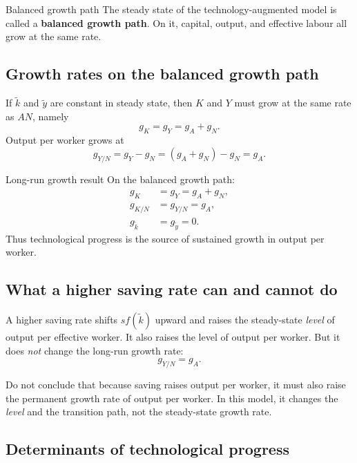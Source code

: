 \documentclass[12pt]{article}
\begin{document}
\begin{definition}{Balanced growth path}{}
The steady state of the technology-augmented model is called a \textbf{balanced growth path}. On it, capital, output, and effective labour all grow at the same rate.
\end{definition}

\subsection{Growth rates on the balanced growth path}

If $\tilde{k}$ and $\tilde{y}$ are constant in steady state, then $K$ and $Y$ must grow at the same rate as $AN$, namely
\[
g_K=g_Y=g_A+g_N.
\]
Output per worker grows at
\[
g_{Y/N}=g_Y-g_N=(g_A+g_N)-g_N=g_A.
\]

\begin{theorem}{Long-run growth result}{}
On the balanced growth path:
\begin{align*}
g_K &= g_Y = g_A+g_N,\\
g_{K/N} &= g_{Y/N} = g_A,\\
g_{\tilde{k}} &= g_{\tilde{y}} = 0.
\end{align*}
Thus technological progress is the source of sustained growth in output per worker.
\end{theorem}

\subsection{What a higher saving rate can and cannot do}

A higher saving rate shifts $sf(\tilde{k})$ upward and raises the steady-state \emph{level} of output per effective worker. It also raises the level of output per worker. But it does \emph{not} change the long-run growth rate:
\[
g_{Y/N}=g_A.
\]

\begin{commonmistake}
Do not conclude that because saving raises output per worker, it must also raise the permanent growth rate of output per worker. In this model, it changes the \emph{level} and the transition path, not the steady-state growth rate.
\end{commonmistake}

\subsection{Determinants of technological progress}
\label{sec:l10mcq}
\end{document}
